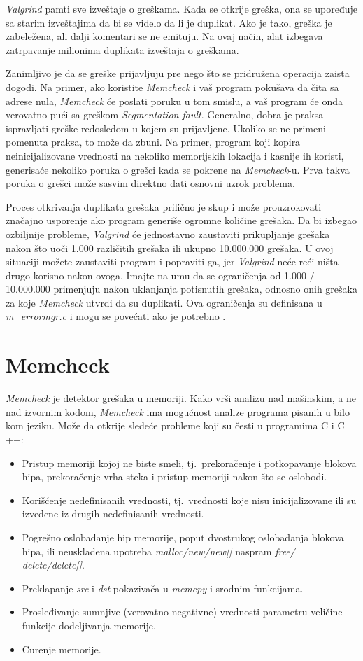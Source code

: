 \documentclass[12pt,oneside]{memoir}
\theoremstyle{plain}
\theoremstyle{definition}
\begin{document}
\textit{Valgrind} pamti sve izveštaje o greškama. Kada se otkrije greška, ona se upoređuje sa starim izveštajima da bi se videlo da li je duplikat. Ako je tako, greška je zabeležena, ali dalji komentari se ne emituju. Na ovaj način, alat izbegava zatrpavanje milionima duplikata izveštaja o greškama.  

Zanimljivo je da se greške prijavljuju pre nego što se pridružena operacija zaista dogodi. Na primer, ako koristite \textit{Memcheck} i vaš program pokušava da čita sa adrese nula, \textit{Memcheck} će poslati poruku u tom smislu, a vaš program će onda verovatno pući sa greškom \textit{Segmentation fault}. Generalno, dobra je praksa ispravljati greške redosledom u kojem su prijavljene. Ukoliko se ne primeni pomenuta praksa, to može da zbuni. Na primer, program koji kopira neinicijalizovane vrednosti na nekoliko memorijskih lokacija i kasnije ih koristi, generisaće nekoliko poruka o grešci kada se pokrene na \textit{Memcheck}-u. Prva takva poruka o grešci može sasvim direktno dati osnovni uzrok problema. 

Proces otkrivanja duplikata grešaka prilično je skup i može prouzrokovati značajno usporenje ako program generiše ogromne količine grešaka. Da bi izbegao ozbiljnije probleme, \textit{Valgrind} će jednostavno zaustaviti prikupljanje grešaka nakon što uoči 1.000 različitih grešaka ili ukupno 10.000.000 grešaka. U ovoj situaciji možete zaustaviti program i popraviti ga, jer \textit{Valgrind} neće reći ništa drugo korisno nakon ovoga. Imajte na umu da se ograničenja od 1.000 / 10.000.000 primenjuju nakon uklanjanja potisnutih grešaka, odnosno onih grešaka za koje \textit{Memcheck} utvrdi da su duplikati. Ova ograničenja su definisana u \textit{m\_errormgr.c} i mogu se povećati ako je potrebno \cite{ValgrindCore}. 

\section{Memcheck}
\textit{Memcheck} je detektor grešaka u memoriji. Kako vrši analizu nad mašinskim, a ne nad izvornim kodom, \textit{Memcheck} ima mogućnost analize programa pisanih u bilo kom jeziku. Može da otkrije sledeće probleme koji su česti u programima C i C ++:
\begin{itemize}
\item Pristup memoriji kojoj ne biste smeli, tj.~prekoračenje i potkopavanje blokova hipa, prekoračenje vrha steka i pristup memoriji nakon što se oslobodi.
\item Korišćenje nedefinisanih vrednosti, tj.~vrednosti koje nisu inicijalizovane ili su izvedene iz drugih nedefinisanih vrednosti.
\item Pogrešno oslobađanje hip memorije, poput dvostrukog oslobađanja blokova hipa, ili neusklađena upotreba \textit{malloc/new/new[]} naspram \textit{free/ delete/delete[]}.
\item Preklapanje \textit{src} i \textit{dst} pokazivača u \textit{memcpy} i srodnim funkcijama.
\item Prosleđivanje sumnjive (verovatno negativne) vrednosti parametru veličine funkcije dodeljivanja memorije.
\item Curenje memorije.
\end{itemize}
\end{document}
